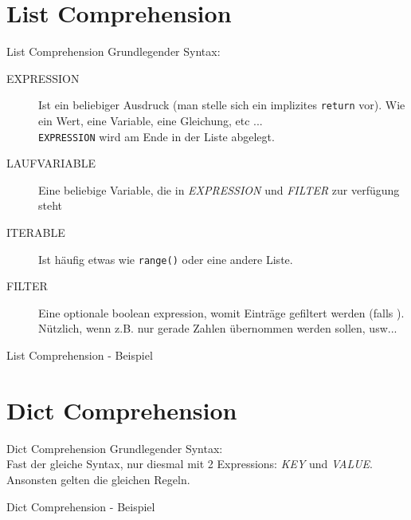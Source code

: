\section{List Comprehension}
\begin{frame}{List Comprehension}
  Grundlegender Syntax: \\
  \begin{description}
    \item[EXPRESSION] Ist ein beliebiger Ausdruck (man stelle sich ein implizites \texttt{return} vor). Wie ein Wert, eine Variable, eine Gleichung, etc ... \\
    	\texttt{EXPRESSION} wird am Ende in der Liste abgelegt.
    \item[LAUFVARIABLE] Eine beliebige Variable, die in \textit{EXPRESSION} und \textit{FILTER} zur verfügung steht
    \item[ITERABLE] Ist häufig etwas wie \texttt{range()} oder eine andere Liste.
    \item[FILTER] Eine optionale boolean expression, womit Einträge gefiltert werden (falls ). N\"utzlich, wenn z.B. nur gerade Zahlen \"ubernommen werden sollen, usw...
  \end{description}

\end{frame}

\begin{frame}{List Comprehension - Beispiel}
	
\end{frame}



\section{Dict Comprehension}
\begin{frame}{Dict Comprehension}
  Grundlegender Syntax: \\[.75cm]
  Fast der gleiche Syntax, nur diesmal mit 2 Expressions: \textit{KEY} und \textit{VALUE}. Ansonsten gelten die gleichen Regeln.
\end{frame}

\begin{frame}{Dict Comprehension - Beispiel}
	
\end{frame}



